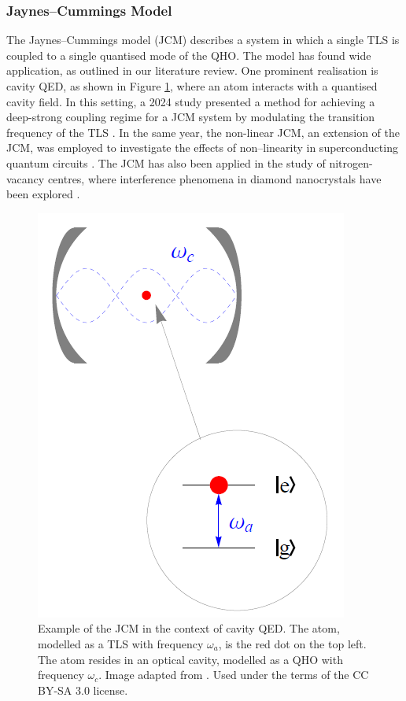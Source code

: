 \documentclass[11pt]{article}
\begin{document}
\subsubsection{Jaynes--Cummings Model} \label{sec:theory_subsub_JCM}

The Jaynes--Cummings model (JCM) describes a system in which a single TLS is coupled to a single quantised mode of the QHO. The model has found wide application, as outlined in our literature review. One prominent realisation is cavity QED, as shown in Figure \ref{fig:img_JCM}, where an atom interacts with a quantised cavity field. In this setting, a 2024 study presented a method for achieving a deep-strong coupling regime for a JCM system by modulating the transition frequency of the TLS \cite{Context2024-CQED_JCM}. In the same year, the non-linear JCM, an extension of the JCM, was employed to investigate the effects of non--linearity in superconducting quantum circuits \cite{Context2024-CircuitQED}. The JCM has also been applied in the study of nitrogen-vacancy centres, where interference phenomena in diamond nanocrystals have been explored \cite{Context2009-Alt_NVcentres}. 
\begin{figure}[h]
    \centering
    \includegraphics[scale=0.5]{Images/Jaynes-Cummings_model.png}
    \caption{Example of the JCM in the context of cavity QED. The atom, modelled as a TLS with frequency $\omega_a$, is the red dot on the top left. The atom resides in an optical cavity, modelled as a QHO with frequency $\omega_c$. Image adapted from \cite{Image-Prince_JCM}. Used under the terms of the CC BY-SA 3.0 license.}
    \label{fig:img_JCM}
\end{figure}
\end{document}
